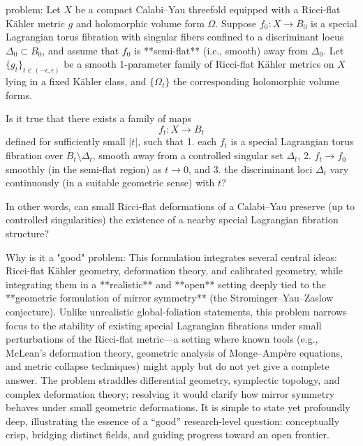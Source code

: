 problem:  
Let \( X \) be a compact Calabi–Yau threefold equipped with a Ricci-flat Kähler metric \( g \) and holomorphic volume form \( \Omega \).  
Suppose \( f_0 : X \to B_0 \) is a special Lagrangian torus fibration with singular fibers confined to a discriminant locus \( \Delta_0 \subset B_0 \), and assume that \( f_0 \) is **semi-flat** (i.e., smooth) away from \( \Delta_0 \).  
Let \( \{g_t\}_{t \in (-\epsilon, \epsilon)} \) be a smooth 1-parameter family of Ricci-flat Kähler metrics on \( X \) lying in a fixed Kähler class, and \( \{\Omega_t\} \) the corresponding holomorphic volume forms.  

Is it true that there exists a family of maps  
\[
f_t : X \to B_t 
\]
defined for sufficiently small \( |t| \), such that  
1. each \( f_t \) is a special Lagrangian torus fibration over \( B_t \setminus \Delta_t \), smooth away from a controlled singular set \( \Delta_t \),  
2. \( f_t \to f_0 \) smoothly (in the semi-flat region) as \( t \to 0 \), and  
3. the discriminant loci \( \Delta_t \) vary continuously (in a suitable geometric sense) with \( t \)?  

In other words, can small Ricci-flat deformations of a Calabi–Yau preserve (up to controlled singularities) the existence of a nearby special Lagrangian fibration structure?  

Why is it a "good" problem:  
This formulation integrates several central ideas: Ricci-flat Kähler geometry, deformation theory, and calibrated geometry, while integrating them in a **realistic** and **open** setting deeply tied to the **geometric formulation of mirror symmetry** (the Strominger–Yau–Zaslow conjecture). Unlike unrealistic global-foliation statements, this problem narrows focus to the stability of existing special Lagrangian fibrations under small perturbations of the Ricci-flat metric—a setting where known tools (e.g., McLean’s deformation theory, geometric analysis of Monge–Ampère equations, and metric collapse techniques) might apply but do not yet give a complete answer.  
The problem straddles differential geometry, symplectic topology, and complex deformation theory; resolving it would clarify how mirror symmetry behaves under small geometric deformations. It is simple to state yet profoundly deep, illustrating the essence of a “good” research-level question: conceptually crisp, bridging distinct fields, and guiding progress toward an open frontier.